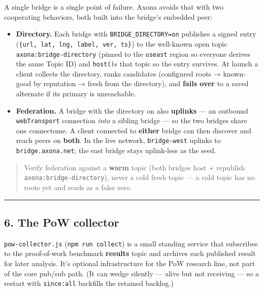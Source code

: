\documentclass[
  nobib]{tufte-handout}
\providecommand{\tightlist}{%
  \setlength{\itemsep}{0pt}\setlength{\parskip}{0pt}}
\begin{document}
A single bridge is a single point of failure. Axona avoids that with two
cooperating behaviors, both built into the bridge's embedded peer:

\begin{itemize}
\tightlist
\item
  \textbf{Directory.} Each bridge with \texttt{BRIDGE\_DIRECTORY=on}
  publishes a signed entry
  (\texttt{\{url,\ lat,\ lng,\ label,\ ver,\ ts\}}) to the well-known
  open topic \texttt{axona:bridge-directory} (pinned to the
  \texttt{useast} region so everyone derives the same Topic ID) and
  \texttt{host()}s that topic so the entry survives. At launch a client
  collects the directory, ranks candidates (configured roots →
  known-good by reputation → fresh from the directory), and
  \textbf{fails over} to a saved alternate if its primary is
  unreachable.
\item
  \textbf{Federation.} A bridge with the directory on also
  \textbf{uplinks} --- an outbound \texttt{webTransport} connection
  \emph{into} a sibling bridge --- so the two bridges share one
  connectome. A client connected to \textbf{either} bridge can then
  discover and reach peers on \textbf{both}. In the live network,
  \texttt{bridge-west} uplinks to \texttt{bridge.axona.net}; the east
  bridge stays uplink-less as the seed.
\end{itemize}

\begin{quote}
Verify federation against a \textbf{warm} topic (both bridges host +
republish \texttt{axona:bridge-directory}), never a cold fresh topic ---
a cold topic has no roots yet and reads as a false zero.
\end{quote}

\begin{center}\rule{0.5\linewidth}{0.5pt}\end{center}

\subsection{6. The PoW collector}\label{the-pow-collector}

\texttt{pow-collector.js} (\texttt{npm\ run\ collect}) is a small
standing service that subscribes to the proof-of-work benchmark
\textbf{results} topic and archives each published result for later
analysis. It's optional infrastructure for the PoW research line, not
part of the core pub/sub path. (It can wedge silently --- alive but not
receiving --- so a restart with
\texttt{since:\textquotesingle{}all\textquotesingle{}} backfills the
retained backlog.)
\end{document}
